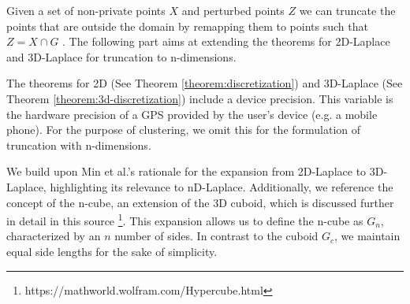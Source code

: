 Given a set of non-private points $X$ and perturbed points $Z$ we can truncate the points that are outside the domain by remapping them to points such that $Z = X \cap G$ \citep{DBLP:journals/corr/abs-1212-1984}.
The following part aims at extending the theorems for 2D-Laplace and 3D-Laplace for truncation to n-dimensions.

The theorems for 2D (See Theorem \ref{theorem:discretization}) and 3D-Laplace (See Theorem \ref{theorem:3d-discretization}) include a device precision. 
This variable is the hardware precision of a GPS provided by the user's device (e.g. a mobile phone). 
For the purpose of clustering, we omit this for the formulation of truncation with n-dimensions. \newline

We build upon Min et al.'s rationale for the expansion from 2D-Laplace to 3D-Laplace, highlighting its relevance to nD-Laplace. 
Additionally, we reference the concept of the n-cube, an extension of the 3D cuboid, which is discussed further in detail in this source \footnote{https://mathworld.wolfram.com/Hypercube.html}.
This expansion allows us to define the n-cube as $G_n$, characterized by an $n$ number of sides. In contrast to the cuboid $G_c$, we maintain equal side lengths for the sake of simplicity.

